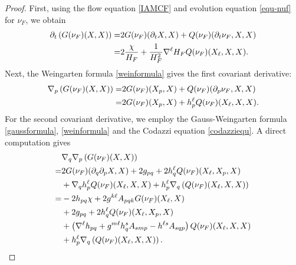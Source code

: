\documentclass[10pt,a4paper]{amsart}
\numberwithin{equation}{section}
\begin{document}
\begin{proof}
		First, using the flow equation \eqref{IAMCF} and evolution equation \eqref{equ-nuf} for $\nu_F$, we obtain
		\begin{align}
			\partial_t \left( G(\nu_F)(X,X) \right) =& 2 G(\nu_F)(\partial_t X,X) + 	Q(\nu_F)(\partial_t\nu_F,X,X) \notag\\
			=& 2 \dfrac{\chi}{H_F} + \dfrac{1}{H_F^2}\nabla^{\ell} H_F Q(\nu_F)(X_\ell,X,X).  \label{equ-ptg}
		\end{align}
		Next, the Weingarten formula \eqref{weinformula} gives the first covariant derivative:
		\begin{align}
			\nabla_p\left( G(\nu_F)(X,X) \right) =& 2G(\nu_F)(X_p,X) + Q(\nu_F)(\partial_p \nu_F,X,X) \notag\\
			=& 2G(\nu_F)(X_p,X) + h^{\ell}_p Q(\nu_F)(X_{\ell},X,X). \label{equ-dpg}
		\end{align}		
		For the second covariant derivative, we employ the Gauss-Weingarten formula \eqref{gaussformula}, \eqref{weinformula} and the Codazzi equation \eqref{codazziequ}. A direct computation gives
		\begin{align}
			&\nabla_q\nabla_p\left( G(\nu_F)(X,X) \right) \notag\\
			=& 2G(\nu_F)(\partial_q\partial_p X,X) + 2g_{pq} + 2h_q^{\ell}Q(\nu_F)(X_{\ell},X_p, X) \notag\\
			&+ \nabla_qh^{\ell}_p Q(\nu_F)(X_{\ell},X,X) + h^{\ell}_p \nabla_q \left(Q(\nu_F)(X_{\ell},X,X)\right) \notag\\
			=& -2h_{pq}\chi + 2g^{k\ell}A_{pqk}G(\nu_F)(X_{\ell},X)\nonumber\\
			&+2g_{pq} + 2h_q^{\ell}Q(\nu_F)(X_{\ell},X_p, X)\notag\\
			&+\left( \nabla^{\ell}h_{pq} + g^{m\ell}h^s_q A_{smp} - h^{\ell s}A_{sqp} \right)Q(\nu_F)(X_{\ell},X,X) \notag\\
			& + h^{\ell}_p\nabla_q\left( Q(\nu_F)(X_{\ell},X,X) \right). \label{equ-hessg}
		\end{align}
		

\end{proof}
\end{document}

